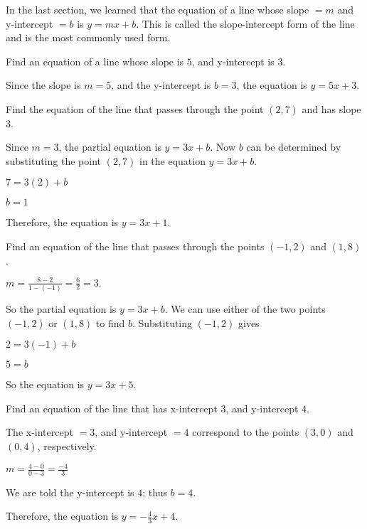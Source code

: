 In the last section, we learned that the equation of a line whose slope $= m$ and y-intercept $= b$ is $y = mx + b$. This is called the slope-intercept form of the line and is the most commonly used form.

\begin{example}
Find an equation of a line whose slope is $5$, and y-intercept is $3$.
\end{example}

\begin{solution}
Since the slope is $m = 5$, and the y-intercept is $b = 3$, the equation is $y = 5x + 3$.
\end{solution}

\begin{example}
Find the equation of the line that passes through the point $(2, 7)$ and has slope $3$.
\end{example}

\begin{solution}
Since $m = 3$, the partial equation is $y = 3x + b$. Now $b$ can be determined by substituting the point $(2, 7)$ in the equation $y = 3x + b$.

$7 = 3(2) + b$

$b = 1$

Therefore, the equation is $y = 3x + 1$.
\end{solution}

\begin{example}
Find an equation of the line that passes through the points $(-1, 2)$ and $(1, 8)$.
\end{example}

\begin{solution}
$m = \frac{8 - 2}{1 - (-1)} = \frac{6}{2} = 3.$

So the partial equation is $y = 3x + b$. We can use either of the two points $(-1, 2)$ or $(1, 8)$ to find $b$. Substituting $(-1, 2)$ gives

$2 = 3(-1) + b$

$5 = b$

So the equation is $y = 3x + 5$.
\end{solution}

\begin{example}
Find an equation of the line that has x-intercept $3$, and y-intercept $4$.
\end{example}

\begin{solution}
The x-intercept $= 3$, and y-intercept $= 4$ correspond to the points $(3, 0)$ and $(0, 4)$, respectively.

$m = \frac{4 - 0}{0 - 3} = \frac{-4}{3}$

We are told the y-intercept is $4$; thus $b = 4$.

Therefore, the equation is $y = -\frac{4}{3}x + 4$.
\end{solution}

